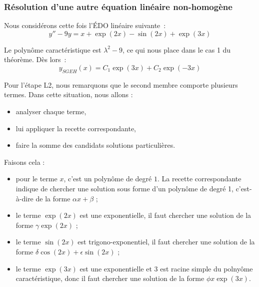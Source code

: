 \subsubsection{Résolution d'une autre équation linéaire non-homogène}
\begin{frame}
Nous considérons cette fois l'ÉDO linéaire suivante~:
\begin{equation*}
  y'' - 9 y = x + \exp{(2x)} - \sin(2x) + \exp{(3x)}
\end{equation*}\pause{}

Le polynôme caractéristique est \(\lambda^{2} - 9\), ce qui nous place dans le cas 1 du théorème.\pause{} Dès lors~:
\begin{equation*}
  y_{SGEH}(x) = C_{1}\exp(3x) + C_{2}\exp(-3x)
\end{equation*}
\end{frame}
\begin{frame}
  Pour l'étape L2, nous remarquons que le second membre comporte plusieurs termes.\pause{} Dans cette situation, nous allons :
  \begin{itemize}[<+->]
  \item analyser chaque terme,
  \item lui appliquer la recette correspondante,
  \item faire la somme des candidats solutions particulières.
  \end{itemize}

  Faisons cela :\pause{}
  \begin{itemize}
  \item pour le terme \(x\), c'est un polynôme de degré \(1\).\pause{} La recette correspondante indique de chercher une solution sous forme d'un polynôme de degré 1, c'est-à-dire de la forme \(\alpha x + \beta\) ;\pause{}
  \item le terme \(\exp(2x)\) est une exponentielle,\pause{} il faut chercher une solution de la forme \(\gamma \exp(2x)\) ;\pause{}
  \item le terme \(\sin(2x)\) est trigono-exponentiel,\pause{} il faut chercher une solution de la forme \(\delta \cos(2x) + \epsilon \sin(2x)\) ;\pause{}
  \item le terme \(\exp(3x)\) est une exponentielle et \(3\) est racine simple du polnyôme caractéristique,\pause{} donc il faut chercher une solution de la forme \(\phi x \exp(3x)\).\pause{}
  \end{itemize}
\end{frame}

